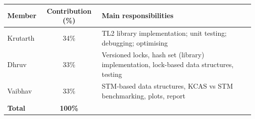 \documentclass[11pt,a4paper]{article}
\begin{document}
\begin{center}
\begin{tabular}{@{}l c p{8cm}@{}}
\toprule
\textbf{Member} & \textbf{Contribution (\%)} & \textbf{Main responsibilities} \\
\midrule
Krutarth & 34\% & TL2 library implementation; unit testing; debugging; optimising \\
Dhruv    & 33\% & Versioned locks, hash set (library) implementation, lock-based data structures, testing \\
Vaibhav  & 33\% & STM-based data structures, KCAS vs STM benchmarking, plots, report \\
\midrule
\textbf{Total} & \textbf{100\%} & \\
\bottomrule
\end{tabular}
\end{center}



\end{document}
